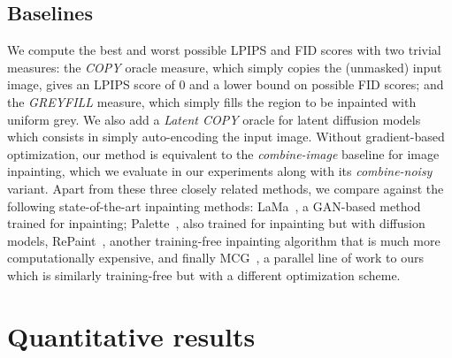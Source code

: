 \subsection{Baselines}  We compute the best and worst possible LPIPS and FID scores with two trivial measures: 
the \textit{COPY} oracle measure, which simply copies the (unmasked) input image, gives an LPIPS score of $0$ and a lower bound on 
possible FID scores; and the \textit{GREYFILL} measure, which simply fills the region to be inpainted with uniform grey. 
We also add a \textit{Latent COPY} oracle for latent diffusion models which consists in simply auto-encoding the input image.
Without
 gradient-based optimization, our method is equivalent to the \textit{combine-image} baseline for image inpainting, which we evaluate 
 in our experiments along with its \textit{combine-noisy} variant. Apart from these three closely related methods, we compare against
  the following state-of-the-art inpainting methods:  LaMa~\citep{lama}, a GAN-based method trained for inpainting; 
  Palette~\citep{saharia2022palette}, also trained for inpainting but with diffusion models, RePaint~\citep{lugmayr2022repaint}, another
   training-free inpainting algorithm that is much more computationally expensive, and finally MCG~\citep{mcg}, a parallel line 
   of work to ours which is similarly training-free but with a different optimization scheme. 


\section{Quantitative results}


